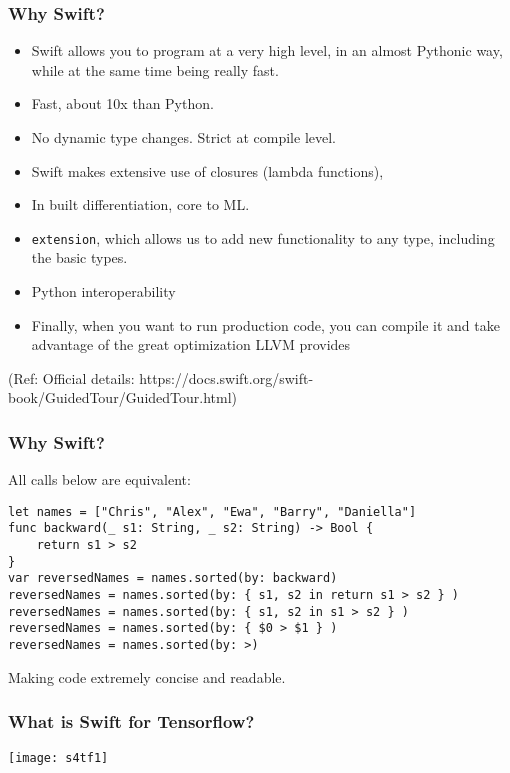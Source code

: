 \begin{frame}[fragile] \frametitle{Why Swift?}

\begin{itemize}
\item Swift allows you to program at a very high level, in an almost Pythonic way, while at the same time being really fast.
\item Fast, about 10x than Python.
\item No dynamic type changes. Strict at compile level.
\item Swift makes extensive use of closures (lambda functions),
\item In built differentiation, core to ML.
\item \lstinline|extension|, which allows us to add new functionality to any type, including the basic types.
\item Python interoperability
\item Finally, when you want to run production code, you can compile it and take advantage of the great optimization LLVM provides
\end{itemize}


{\tiny (Ref: Official details: https://docs.swift.org/swift-book/GuidedTour/GuidedTour.html)}

\end{frame}

\begin{frame}[fragile] \frametitle{Why Swift?}

All calls below are equivalent:

\begin{lstlisting}
let names = ["Chris", "Alex", "Ewa", "Barry", "Daniella"]
func backward(_ s1: String, _ s2: String) -> Bool {
    return s1 > s2
}
var reversedNames = names.sorted(by: backward)
reversedNames = names.sorted(by: { s1, s2 in return s1 > s2 } )
reversedNames = names.sorted(by: { s1, s2 in s1 > s2 } )
reversedNames = names.sorted(by: { $0 > $1 } )
reversedNames = names.sorted(by: >)
\end{lstlisting}

Making code extremely concise and readable.


\end{frame}

\begin{frame} \frametitle{What is Swift for Tensorflow?}
\begin{center}
\texttt{[image: s4tf1]}
\end{center}
\end{frame}

